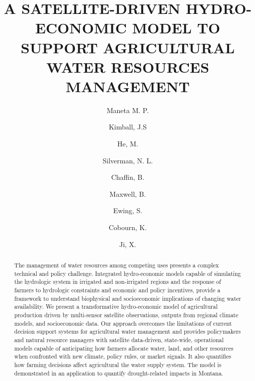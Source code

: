 \documentclass[review]{elsarticle}
\begin{document}
\begin{frontmatter}

\title{A SATELLITE-DRIVEN HYDRO-ECONOMIC MODEL TO SUPPORT AGRICULTURAL WATER RESOURCES MANAGEMENT}

\author[mycorrespondingauthor]{Maneta M. P.}
\author{Kimball, J.S}
\author{He, M.}
\author{Silverman, N. L.}
\author{Chaffin, B.}
\address{Geosciences Department, University of Montana, Missoula, MT}

\author{Maxwell, B.}
\author{Ewing, S.}

\address{Land Resources and Environmental Sciences, Montana State University, Bozeman, MT}


\author{Cobourn, K.}
\address{Department of Forest Resources and Environmental Conservation, Virginia Tech, Blacksburg, VA}

\author{Ji, X.}
\address{Department of Economics and Environmental Studies Program, Brandeis University, Waltham, MA}




\begin{abstract}
The management of water resources among competing uses presents a complex technical and policy challenge.  Integrated hydro-economic models capable of simulating the hydrologic system in irrigated and non-irrigated regions and the response of farmers to hydrologic constraints and economic and policy incentives, provide a framework to understand biophysical and socioeconomic implications of changing water availability.  We present a transformative hydro-economic model of agricultural production driven by multi-sensor satellite observations, outputs from regional climate models, and socioeconomic data. Our approach overcomes the limitations of current decision support systems for agricultural water management and provides policymakers and natural resource managers with satellite data-driven, state-wide, operational models capable of anticipating how farmers allocate water, land, and other resources when confronted with new climate, policy rules, or market signals. It also quantifies how farming decisions affect agricultural the water supply system. The model is demonstrated in an application to quantify drought-related impacts in Montana. 
\end{abstract}


\end{frontmatter}
\end{document}
